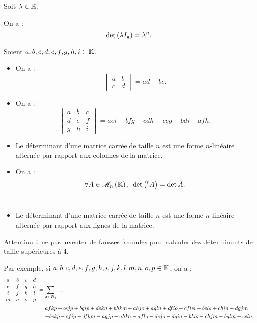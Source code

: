 \begin{ex}
Soit \(\lambda\in\mathbb{K}\).

On a : \[\det\left(\lambda I_n\right)=\lambda^n.\]
\end{ex}

\begin{ex}
Soient \(a,b,c,d,e,f,g,h,i\in\mathbb{K}\).

\begin{itemize}
    \item On a : \[\begin{vmatrix}
        a & b \\
        c & d
    \end{vmatrix}=ad-bc.\]
    \item On a : \[\begin{vmatrix}
        a & b & c \\
        d & e & f \\
        g & h & i
    \end{vmatrix}=aei+bfg+cdh-ceg-bdi-afh.\]
\end{itemize}
\end{ex}

\begin{prop}
\begin{itemize}
    \item Le déterminant d'une matrice carrée de taille \(n\) est une forme \(n\)-linéaire alternée par rapport aux colonnes de la matrice. \\
    \item On a : \[\quantifs{\forall A\in\M{n}}\det\paren{\trans{A}}=\det A.\]~
    \item Le déterminant d'une matrice carrée de taille \(n\) est une forme \(n\)-linéaire alternée par rapport aux lignes de la matrice.
\end{itemize}
\end{prop}

\begin{rem}
Attention à ne pas inventer de fausses formules pour calculer des déterminants de taille supérieures à \(4\).

Par exemple, si \(a,b,c,d,e,f,g,h,i,j,k,l,m,n,o,p\in\mathbb{K}\), on a : \[\begin{aligned}
\begin{vmatrix}
a & b & c & d \\
e & f & g & h \\
i & j & k & l \\
m & n & o & p
\end{vmatrix}&=\sum_{\sigma\in\S{4}}\dots \\
&=afkp+cejp+bgip+dekn+bhkm+ahjo+agln+dfio+cflm+belo+chin+dgjm \\
&\color{white}=\color{black}-bekp-cfip-dfkm-agjp-ahkn-aflo-dejo-dgin-bhio-chjm-bglm-celn.
\end{aligned}\]
\end{rem}

